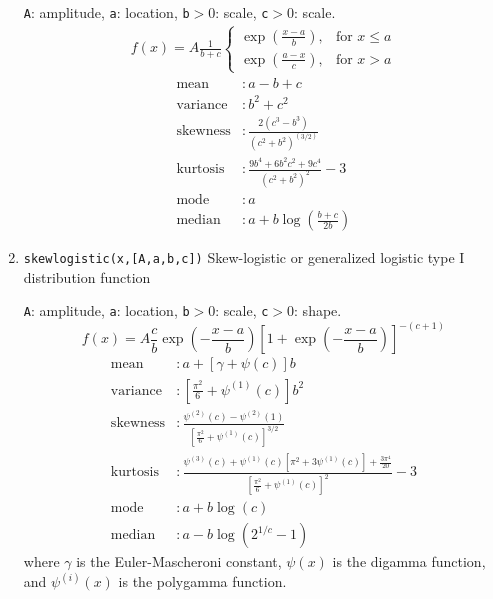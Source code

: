 \documentclass[reprint,showpacs,prb,nofootinbib,amsmath,amssymb]{revtex4-1}
\begin{document}
\begin{enumerate}
\verb|A|: amplitude, \verb|a|: location, \verb|b|$>0$: scale, \verb|c|$>0$: scale.
\begin{eqnarray}
f(x)=A\frac{1}{b+c}
\begin{cases}
\exp\left(\frac{x-a}{b}\right), &\text{for }x\leq a \\
\exp\left(\frac{a-x}{c}\right), &\text{for }x>a  \nonumber
\end{cases}
\end{eqnarray}
\begin{align}
	\mbox{mean} 		&: \mbox{$a-b+c$} \nonumber \\
	\mbox{variance}		&: \mbox{$b^2+c^2$} \nonumber \\
	\mbox{skewness}     &: \mbox{$\frac{2(c^3-b^3)}{(c^2+b^2)^{(3/2)}}$} \nonumber \\
	\mbox{kurtosis}     &: \mbox{$\frac{9b^4+6b^2c^2+9c^4}{(c^2+b^2)^2}-3$} \nonumber \\	
	\mbox{mode} 	    &: \mbox{$a$} \nonumber \\
	\mbox{median}       &: \mbox{$a+b\log\left(\frac{b+c}{2b}\right)$}  \nonumber
\end{align}

\item \verb|skewlogistic(x,[A,a,b,c])| Skew-logistic or generalized logistic type I distribution function~\cite{McLaughlin,skewlogistic}

\verb|A|: amplitude, \verb|a|: location, \verb|b|$>0$: scale, \verb|c|$>0$: shape.
\begin{equation}
f(x)=A\frac{c}{b}\exp\left(-\frac{x-a}{b}\right)\left[1+\exp\left(-\frac{x-a}{b}\right)\right]^{-(c+1)} \nonumber
\end{equation}
\begin{align}
	\mbox{mean} 		&: \mbox{$a+[\gamma+\psi(c)]b$} \nonumber \\
	\mbox{variance}		&: \mbox{$\left[\frac{\pi^2}{6}+\psi^{(1)}(c)\right]b^2$} \nonumber \\
	\mbox{skewness} 	&: \mbox{$\frac{\psi^{(2)}(c)-\psi^{(2)}(1)}{\left[\frac{\pi^2}{6}+\psi^{(1)}(c)\right]^{3/2}}$} \nonumber \\	
	\mbox{kurtosis} 	&: \mbox{$\frac{\psi^{(3)}(c)+\psi^{(1)}(c)\left[\pi^2+3\psi^{(1)}(c)\right]+\frac{3\pi^4}{20}}{\left[\frac{\pi^2}{6}+\psi^{(1)}(c)\right]^2}-3$} \nonumber \\	
	\mbox{mode}         &: \mbox{$a+b\log(c)$}  \nonumber \\
	\mbox{median}       &: \mbox{$a-b\log(2^{1/c}-1)$}  \nonumber
\end{align}
where $\gamma$ is the Euler-Mascheroni constant, $\psi(x)$ is the digamma function, and $\psi^{(i)}(x)$ is the polygamma function.


\end{enumerate}
\end{document}
